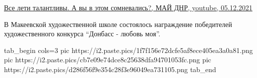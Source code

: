  
 
 
 
 

\href{https://www.youtube.com/watch?v=Ifm3p8vAEsM}{%
Все лети талантливы. А вы в этом сомневались?, МАЙ ДНР, youtube, 05.12.2021%
}

В Макеевской художественной школе состоялось награждение  победителей
художественного конкурса \enquote{Донбасс - любовь моя}. 

\ifcmt
  tab_begin cols=3
		 pic https://i2.paste.pics/1f7f156e72dcfe5af8ece405ea3a0a81.png
     pic https://i2.paste.pics/cb7e09e74dce8c25638dfa94701053fc.png
		 pic https://i2.paste.pics/d286f56f9e354c28f3e96049ea731105.png
  tab_end
\fi
